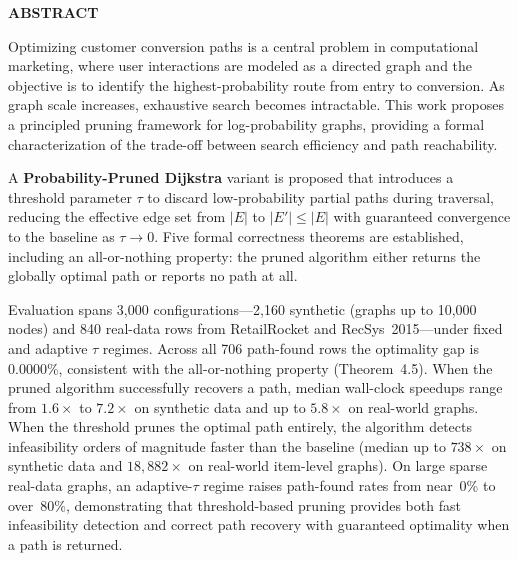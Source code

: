 {}

\begin{center}
    \large{\bf ABSTRACT}
\end{center}

Optimizing customer conversion paths is a central problem in computational marketing, where user interactions are modeled as a directed graph and the objective is to identify the highest-probability route from entry to conversion. As graph scale increases, exhaustive search becomes intractable. This work proposes a principled pruning framework for log-probability graphs, providing a formal characterization of the trade-off between search efficiency and path reachability.

A \textbf{Probability-Pruned Dijkstra} variant is proposed that introduces a threshold parameter $\tau$ to discard low-probability partial paths during traversal, reducing the effective edge set from $|E|$ to $|E'|\leq|E|$ with guaranteed convergence to the baseline as $\tau\to 0$. Five formal correctness theorems are established, including an all-or-nothing property: the pruned algorithm either returns the globally optimal path or reports no path at all.

Evaluation spans 3,000 configurations---2,160 synthetic (graphs up to 10,000 nodes) and 840 real-data rows from RetailRocket and RecSys~2015---under fixed and adaptive $\tau$ regimes. Across all 706 path-found rows the optimality gap is $0.0000\%$, consistent with the all-or-nothing property (Theorem~4.5). When the pruned algorithm successfully recovers a path, median wall-clock speedups range from $1.6\times$ to $7.2\times$ on synthetic data and up to $5.8\times$ on real-world graphs. When the threshold prunes the optimal path entirely, the algorithm detects infeasibility orders of magnitude faster than the baseline (median up to $738\times$ on synthetic data and $18{,}882\times$ on real-world item-level graphs). On large sparse real-data graphs, an adaptive-$\tau$ regime raises path-found rates from near~0\% to over~80\%, demonstrating that threshold-based pruning provides both fast infeasibility detection and correct path recovery with guaranteed optimality when a path is returned.
